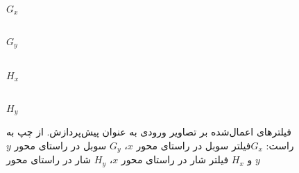 \begin{figure}[H]
\begin{latin}
\begin{center}
\noindent
\noindent
\begin{minipage}[ht]{0.2\linewidth}
\begin{center}
\\
\smallskip
$G_x$

\end{center}
\end{minipage}
\quad
%
\noindent\begin{minipage}[ht]{0.2\linewidth}
\begin{center}
\\
\smallskip
$G_y$
\end{center}
\end{minipage}
\quad
%
\noindent\begin{minipage}[ht]{0.2\linewidth}
\begin{center}
\\
\smallskip
$H_x$
\end{center}
\end{minipage}
\quad
%
\noindent
\begin{minipage}[ht]{0.2\linewidth}
\begin{center}
\\
\smallskip
$H_y$
\end{center}
\end{minipage}
\quad
\end{center}
\end{latin}	
\caption{
	فیلترهای اعمال‌شده بر تصاویر ورودی به عنوان پیش‌پردازش.
	از چپ به راست: $G_x$فیلتر سوبل در راستای محور $x$، $G_y$ سوبل در راستای محور $y$ 
	و $H_x$ فیلتر شار در راستای محور $x$، $H_y$ شار در راستای محور $y$ 
}
\label{fig:filters}
\end{figure}

